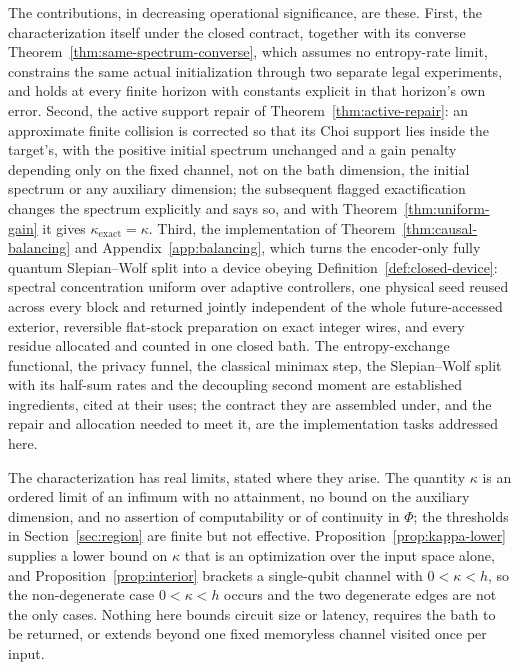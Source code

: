 \documentclass[11pt,a4paper]{article}
\numberwithin{equation}{section}
\theoremstyle{plain}
\theoremstyle{definition}
\newcommand{\kexact}{\kappa_{\mathrm{exact}}}
\begin{document}
The contributions, in decreasing operational significance, are these. First,
the characterization itself under the closed contract, together with its
converse Theorem~\ref{thm:same-spectrum-converse}, which assumes no
entropy-rate limit, constrains the same actual initialization through two
separate legal experiments, and holds at every finite horizon with constants
explicit in that horizon's own error. Second, the active support
repair of Theorem~\ref{thm:active-repair}: an approximate finite collision is
corrected so that its Choi support lies inside the target's, with the positive
initial spectrum unchanged and a gain penalty depending only on the fixed
channel, not on the bath dimension, the initial spectrum or any auxiliary
dimension; the subsequent flagged exactification changes the spectrum
explicitly and says so, and with Theorem~\ref{thm:uniform-gain} it gives
$\kexact=\kappa$. Third, the implementation of
Theorem~\ref{thm:causal-balancing} and Appendix~\ref{app:balancing}, which
turns the encoder-only fully quantum Slepian--Wolf split into a device obeying
Definition~\ref{def:closed-device}: spectral concentration uniform over
adaptive controllers, one physical seed reused across every block and returned
jointly independent of the whole future-accessed exterior, reversible
flat-stock preparation on exact integer wires, and every residue allocated and
counted in one closed bath. The entropy-exchange functional, the privacy
funnel, the classical minimax step, the Slepian--Wolf split with its half-sum
rates and the decoupling second moment are established ingredients, cited at
their uses; the contract they are assembled under, and the repair and
allocation needed to meet it, are the implementation tasks addressed here.

The characterization has real limits, stated where they arise. The quantity
$\kappa$ is an ordered limit of an infimum with no attainment, no bound on the
auxiliary dimension, and no assertion of computability or of continuity in
$\Phi$; the thresholds in Section~\ref{sec:region} are finite but not
effective. Proposition~\ref{prop:kappa-lower} supplies a lower bound on
$\kappa$ that is an optimization over the input space alone, and
Proposition~\ref{prop:interior} brackets a single-qubit channel with
$0<\kappa<h$, so the non-degenerate case $0<\kappa<h$ occurs and the two
degenerate edges are not the only cases. Nothing here bounds circuit size or
latency, requires the bath to be returned, or extends beyond one fixed
memoryless channel visited once per input.
\end{document}
